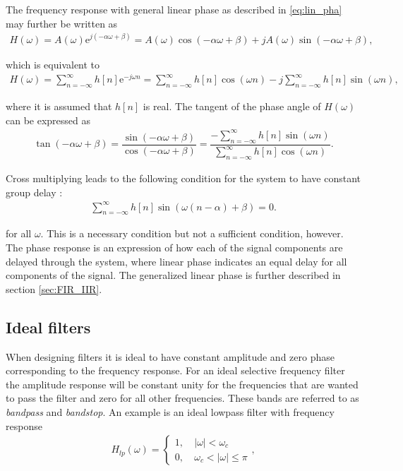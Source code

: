 The frequency response with general linear phase as described in \ref{eq:lin_pha} may further be written as
\begin{align*}
H(\omega) = A(\omega) \text{e}^{j(-\alpha\omega + \beta)} = A(\omega) \cos(-\alpha\omega + \beta) + j A(\omega) \sin(-\alpha\omega + \beta),
\end{align*}

which is equivalent to
\begin{align*}
H(\omega) = \sum_{n=-\infty}^\infty h[n] \text{e}^{-j \omega n} = \sum_{n=-\infty}^\infty h[n] \cos(\omega n) - j \sum_{n=-\infty}^\infty h[n] \sin(\omega n),
\end{align*}

where it is assumed that $h[n]$ is real. The tangent of the phase angle of $H(\omega)$ can be expressed as
\begin{align*}
\tan(-\alpha\omega + \beta) = \dfrac{\sin(-\alpha\omega + \beta)}{\cos(-\alpha\omega + \beta)} = \dfrac{- \sum_{n=-\infty}^\infty h[n] \sin(\omega n)}{\sum_{n=-\infty}^\infty h[n] \cos(\omega n)}.
\end{align*}

Cross multiplying leads to the following condition for the system to have constant group delay \cite{page 341, DTSP}:
\begin{align}\label{eq:cons_gro}
\sum_{n=-\infty}^{\infty}h[n]\sin\left(\omega \left(n-\alpha \right) + \beta \right) = 0.
\end{align}

for all $\omega$. This is a necessary condition but not a sufficient condition, however. The phase response is an expression of how each of the signal components are delayed through the system, where linear phase indicates an equal delay for all components of the signal. The generalized linear phase is further described in section \ref{sec:FIR_IIR}.

\subsection{Ideal filters} \label{sec:ideal_filt}
When designing filters it is ideal to have constant amplitude and zero phase corresponding to the frequency response. For an ideal selective frequency filter the amplitude response will be constant unity for the frequencies that are wanted to pass the filter and zero for all other frequencies. These bands are referred to as \textit{bandpass} and \textit{bandstop}. An example is an ideal lowpass filter with frequency response 
\begin{align}\label{eq:low}
H_{lp}(\omega)=
\left\{ \begin{matrix}
1, &\ \left| \omega \right|< \omega_c \\
0, &\ \omega_c < \left| \omega \right| \leq \pi
\end{matrix}\right.,
\end{align}
    
